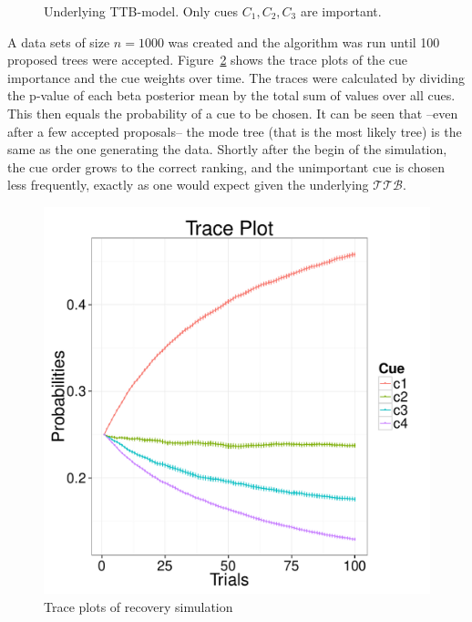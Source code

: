 \documentclass[a4paper,man, natbib]{apa6}
\begin{document}
\FloatBarrier
\begin{figure}
\caption{Underlying TTB-model. Only cues $C_1, C_2,C_3$ are important.}
\label{fig:ttbtruth}
\begin{center}

\end{center}
\end{figure}
\FloatBarrier

A data sets of size $n=1000$ was created and the algorithm was run until 100 proposed trees were accepted. Figure~\ref{ttbrecover} shows the trace plots of the cue importance and the cue weights over time. The traces were calculated by dividing the p-value of each beta posterior mean by the total sum of values over all cues. This then equals the probability of a cue to be chosen. It can be seen that --even after a few accepted proposals-- the mode tree (that is the most likely tree) is the same as the one generating the data. Shortly after the begin of the simulation, the cue order grows to the correct ranking, and the unimportant cue is chosen less frequently, exactly as one would expect given the underlying $\mathcal{TTB}$.

\begin{figure}[htb!]
  \caption{Trace plots of recovery simulation}
\label{ttbrecover}
  \centering
    \includegraphics[scale=0.5]{figs/ttbrecovertrace.pdf}
\end{figure}
\end{document}
